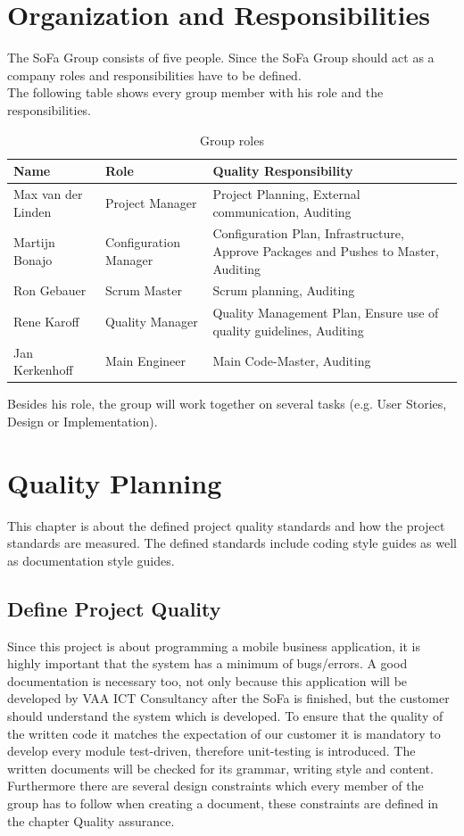\documentclass[12pt]{article}
\begin{document}
\section{Organization and Responsibilities}
The SoFa Group consists of five people. Since the SoFa Group should act as a company roles and responsibilities have to be defined.\\
The following table shows every group member with his role and the responsibilities.
\begin{table}[htbp]
	\begin{tabularx}{\textwidth}{ X X X }
		\textbf{Name} & \textbf{Role} & \textbf{Quality Responsibility} \\ \hline
		Max van der Linden & Project Manager & Project Planning, External communication, Auditing \\ 
		Martijn Bonajo & Configuration Manager & Configuration Plan, Infrastructure, Approve Packages and Pushes to Master, Auditing \\ 
		Ron Gebauer & Scrum Master & Scrum planning, Auditing \\ 
		Rene Karoff & Quality Manager & Quality Management Plan, Ensure use of quality guidelines, Auditing \\ 
		Jan Kerkenhoff & Main Engineer & Main Code-Master, Auditing \\
	\end{tabularx}
	\caption{Group roles\label{tab:GroupRoles}}
\end{table}
Besides his role, the group will work together on several tasks (e.g. User Stories, Design or Implementation).
\clearpage
\section{Quality Planning}
This chapter is about the defined project quality standards and how the project standards are measured. The defined standards include coding style guides as well as documentation style guides.

\subsection{Define Project Quality}
Since this project is about programming a mobile business application, it is highly important that the system has a minimum of bugs/errors. A good documentation is necessary too, not only because this application will be developed by VAA ICT Consultancy after the SoFa is finished, but the customer should understand the system which is developed.
To ensure that the quality of the written code it matches the expectation of our customer it is mandatory to develop every module test-driven, therefore unit-testing is introduced. The written documents will be checked for its grammar, writing style and content.\\
Furthermore there are several design constraints which every member of the group has to follow when creating a document, these constraints are defined in the chapter Quality assurance.
\end{document}
